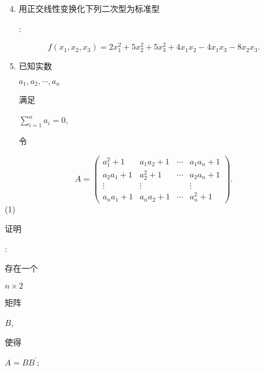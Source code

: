 \documentclass[10pt]{article}
\begin{document}
\begin{enumerate}
  \setcounter{enumi}{3}
  \item \begin{CJK}{UTF8}{mj}用正交线性变换化下列二次型为标准型\end{CJK}:
\end{enumerate}
$$
f\left(x_{1}, x_{2}, x_{3}\right)=2 x_{1}^{2}+5 x_{2}^{2}+5 x_{3}^{2}+4 x_{1} x_{2}-4 x_{1} x_{3}-8 x_{2} x_{3} .
$$

\begin{enumerate}
  \setcounter{enumi}{4}
  \item \begin{CJK}{UTF8}{mj}已知实数\end{CJK} $a_{1}, a_{2}, \cdots, a_{n}$ \begin{CJK}{UTF8}{mj}满足\end{CJK} $\sum_{i=1}^{n} a_{i}=0$, \begin{CJK}{UTF8}{mj}令\end{CJK}
\end{enumerate}
$$
A=\left(\begin{array}{cccc}
a_{1}^{2}+1 & a_{1} a_{2}+1 & \cdots & a_{1} a_{n}+1 \\
a_{2} a_{1}+1 & a_{2}^{2}+1 & \cdots & a_{2} a_{n}+1 \\
\vdots & \vdots & & \vdots \\
a_{n} a_{1}+1 & a_{n} a_{2}+1 & \cdots & a_{n}^{2}+1
\end{array}\right) .
$$
(1) \begin{CJK}{UTF8}{mj}证明\end{CJK}: \begin{CJK}{UTF8}{mj}存在一个\end{CJK} $n \times 2$ \begin{CJK}{UTF8}{mj}矩阵\end{CJK} $B$, \begin{CJK}{UTF8}{mj}使得\end{CJK} $A=B B^{\prime}$;
\end{document}
